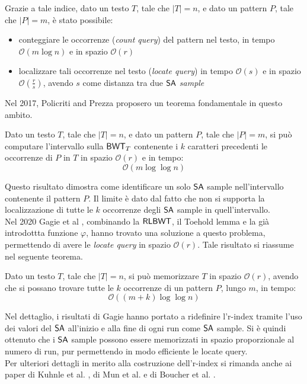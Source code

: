 Grazie a tale indice, dato un testo $T$, tale che
$|T|=n$, e dato un pattern $P$, tale che $|P|=m$, è stato possibile: 
\begin{itemize}
  \item conteggiare le occorrenze (\textit{count query}) del pattern nel testo,
  in tempo $\mathcal{O}(m\log n)$ e in spazio $\mathcal{O}(r)$  
  \item localizzare tali occorrenze nel testo (\textit{locate query}) in tempo
  $\mathcal{O}(s)$ e in spazio $\mathcal{O}\left(\frac{r}{s}\right)$, avendo $s$
  come distanza tra due $\mbox{\rm {\sf SA}}$ \textit{sample}
\end{itemize}
Nel 2017, Policriti and Prezza \cite{policriti} proposero un teorema
fondamentale in questo ambito.
\begin{teorema}
  Dato un testo $T$, tale che $|T|=n$, e dato un pattern $P$, tale
  che $|P|=m$, si può computare l'intervallo sulla $\mbox{\rm {\sf BWT}}_T$ contenente i $k$
  caratteri precedenti le occorrenze di $P$ in $T$ in spazio $\mathcal{O}(r)$ e
  in tempo: 
  \begin{equation}
    \label{eq:rlbwt3}
    \mathcal{O}(m\log\log n)
  \end{equation}
\end{teorema}
Questo risultato dimostra come identificare un solo $\mbox{\rm {\sf SA}}$ sample
nell'intervallo 
contenente il pattern $P$. Il limite è dato dal fatto che non si supporta la
localizzazione di tutte le $k$ occorrenze degli $\mbox{\rm {\sf SA}}$ sample in
quell'intervallo.\\
Nel 2020 Gagie et al \cite{gagie2020}, combinando la $\mbox{\rm {\sf RLBWT}}$, il
Toehold lemma e la già introdottta funzione $\varphi$, hanno trovato una
soluzione a
questo problema, permettendo di avere le \textit{locate 
  query} in spazio $\mathcal{O}(r)$.
Tale risultato si riassume nel seguente teorema.
\begin{teorema}
  Dato un testo $T$, tale che $|T|=n$, si può memorizzare $T$ in spazio
  $\mathcal{O}(r)$, avendo che si possano trovare tutte le $k$ occorrenze di un
  pattern $P$, lungo $m$, in tempo:
  \begin{equation}
    \label{eq:rlbwt4}
    \mathcal{O}((m+k)\log\log n)
  \end{equation}
\end{teorema}
Nel dettaglio, i risultati di Gagie hanno portato a ridefinire l'r-index
tramite l'uso dei valori del $\mbox{\rm {\sf SA}}$ all'inizio e alla fine di ogni run come
$\mbox{\rm {\sf SA}}$ sample. Si è quindi ottenuto che i $\mbox{\rm {\sf SA}}$ sample possono
essere memorizzati in spazio proporzionale al numero di run, 
pur permettendo in modo efficiente le locate query.\\
Per ulteriori dettagli in merito alla costruzione dell'r-index si rimanda anche
ai 
paper di Kuhnle et al. \cite{kuhnle}, di Mun et al. \cite{mun} e di Boucher et
al. \cite{boucher}. 
